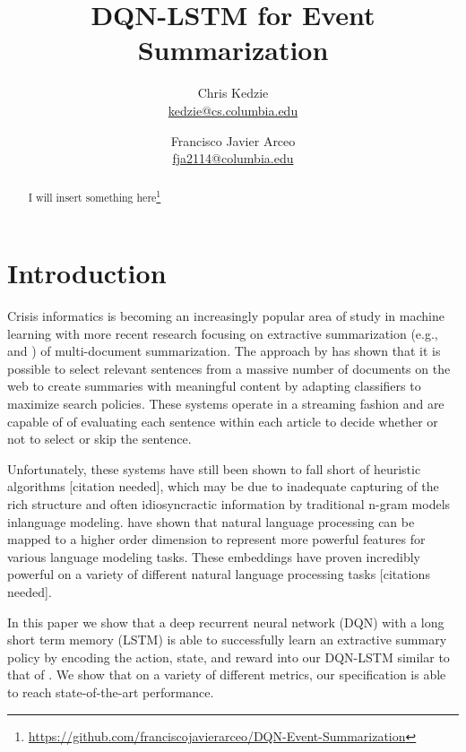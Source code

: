 \documentclass[12pt]{article}
\title{DQN-LSTM for Event Summarization }
\author{
	Chris Kedzie \\ \href{mailto: kedzie@cs.columbia.edu}{\small kedzie@cs.columbia.edu} 
		\and  
	Francisco Javier Arceo \\ \href{mailto: fja2114@columbia.edu}{\small fja2114@columbia.edu} 
	}
\begin{document}
\maketitle

\begin{abstract}
I will insert something here\footnote{ \url{https://github.com/franciscojavierarceo/DQN-Event-Summarization} }
\end{abstract}




\section{Introduction}

Crisis informatics is becoming an increasingly popular area of study in machine learning with more recent research focusing on extractive summarization (e.g., \cite{kedzie2015predicting} and \cite{kedzieextractive}) of multi-document summarization. The approach by \cite{kedzie2015predicting}  has shown that it is possible to select relevant sentences from a massive number of documents on the web to create summaries with meaningful content by adapting classifiers to maximize search policies. These systems operate in a streaming fashion and are capable of of evaluating each sentence within each article to decide whether or not to select or skip the sentence. 

Unfortunately, these systems have still been shown to fall short of heuristic algorithms [citation needed], which may be due to inadequate capturing of the rich structure and often idiosyncractic information by traditional n-gram models  inlanguage modeling. \cite{bengio2003neural} have shown that natural language processing can be mapped to a higher order dimension to represent more powerful features for various language modeling tasks. These embeddings have proven incredibly powerful on a variety of different natural language processing tasks [citations needed].

In this paper we show that a deep recurrent neural network (DQN) with a long short term memory (LSTM) is able to successfully learn an extractive summary policy by encoding the action, state, and reward into our DQN-LSTM similar to that of  \cite{hausknecht2015deep}. We show that on a variety of different metrics, our specification is able to reach state-of-the-art performance.
\end{document}
